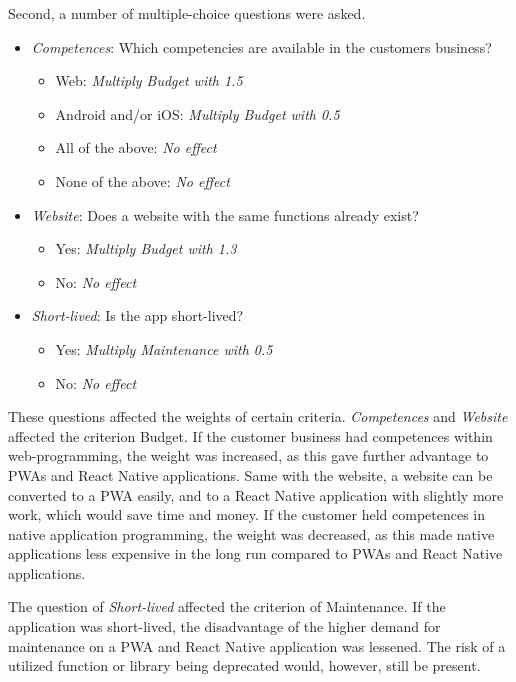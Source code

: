 Second, a number of multiple-choice questions were asked.

\begin{itemize}
    \item \textit{Competences}: Which competencies are available in the customers business?
        \begin{itemize}
            \item Web: \textit{Multiply Budget with 1.5}
            \item Android and/or iOS: \textit{Multiply Budget with 0.5}
            \item All of the above: \textit{No effect}
            \item None of the above: \textit{No effect}
        \end{itemize}
    \item \textit{Website}: Does a website with the same functions already exist? 
        \begin{itemize}
            \item Yes: \textit{Multiply Budget with 1.3}
            \item No: \textit{No effect}
        \end{itemize}
    \item \textit{Short-lived}: Is the app short-lived?
        \begin{itemize}
            \item Yes: \textit{Multiply Maintenance with 0.5}
            \item No: \textit{No effect}
        \end{itemize}
\end{itemize}

These questions affected the weights of certain criteria. \textit{Competences} and \textit{Website} affected the criterion Budget. If the customer business had competences within web-programming, the weight was increased, as this gave further advantage to PWAs and React Native applications. Same with the website, a website can be converted to a PWA easily, and to a React Native application with slightly more work, which would save time and money. If the customer held competences in native application programming, the weight was decreased, as this made native applications less expensive in the long run compared to PWAs and React Native applications.

The question of \textit{Short-lived} affected the criterion of Maintenance. If the application was short-lived, the disadvantage of the higher demand for maintenance on a PWA and React Native application was lessened. The risk of a utilized function or library being deprecated would, however, still be present.

